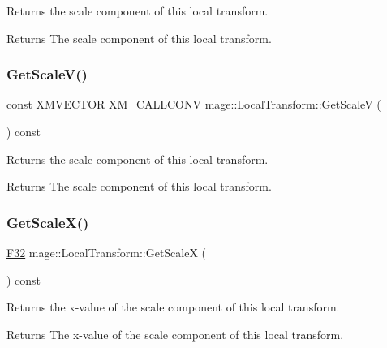 Returns the scale component of this local transform.

\begin{DoxyReturn}{Returns}
The scale component of this local transform. 
\end{DoxyReturn}
\hypertarget{classmage_1_1_local_transform_a6c70ee804326d0b5ff54d282630972bc}{}\label{classmage_1_1_local_transform_a6c70ee804326d0b5ff54d282630972bc} 
\subsubsection{\texorpdfstring{Get\+Scale\+V()}{GetScaleV()}}
{\footnotesize\ttfamily const X\+M\+V\+E\+C\+T\+OR X\+M\+\_\+\+C\+A\+L\+L\+C\+O\+NV mage\+::\+Local\+Transform\+::\+Get\+ScaleV (\begin{DoxyParamCaption}{ }\end{DoxyParamCaption}) const\hspace{0.3cm}{\ttfamily [noexcept]}}

Returns the scale component of this local transform.

\begin{DoxyReturn}{Returns}
The scale component of this local transform. 
\end{DoxyReturn}
\hypertarget{classmage_1_1_local_transform_ad539c04b897276a35bd3f25ad2163371}{}\label{classmage_1_1_local_transform_ad539c04b897276a35bd3f25ad2163371} 
\subsubsection{\texorpdfstring{Get\+Scale\+X()}{GetScaleX()}}
{\footnotesize\ttfamily \hyperlink{namespacemage_aa97e833b45f06d60a0a9c4fc22ae02c0}{F32} mage\+::\+Local\+Transform\+::\+Get\+ScaleX (\begin{DoxyParamCaption}{ }\end{DoxyParamCaption}) const\hspace{0.3cm}{\ttfamily [noexcept]}}

Returns the x-\/value of the scale component of this local transform.

\begin{DoxyReturn}{Returns}
The x-\/value of the scale component of this local transform. 
\end{DoxyReturn}
\hypertarget{classmage_1_1_local_transform_a8c15528f78365b5dc853d1e9035b4cc4}{}\label{classmage_1_1_local_transform_a8c15528f78365b5dc853d1e9035b4cc4} 
